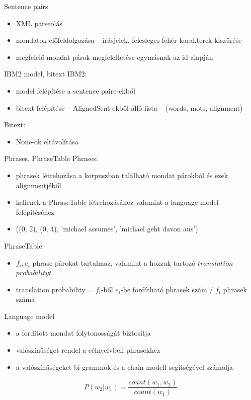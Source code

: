\begin{frame}{Sentence pairs}
	\begin{itemize}
		\item XML parseolás
		\item mondatok előfeldolgozása -- írásjelek, felesleges fehér karakterek kiszűrése
		\item megfelelő mondat párok megfeleltetése egymásnak az id alapján
	\end{itemize}

\end{frame}

\begin{frame}{IBM2 model, bitext}
	IBM2:
	\begin{itemize}
		\item model felépítése a sentence paire-ekből
		\item bitext felépítése -- AlignedSent-ekből álló lista -- (words, mots, alignment)
	\end{itemize}
	
	Bitext:
	\begin{itemize}
		\item None-ok eltávolítása
	\end{itemize}
\end{frame}

\begin{frame}{Phrases, PhraseTable}
	Phrases:
	\begin{itemize}
		\item phrasek létrehozása a korpuszban található mondat párokból és ezek alignmentjéből
		\item kellenek a PhraseTable létrehozásához valamint a language model felépítéséhez
		\item ((0, 2), (0, 4), 'michael assumes', 'michael geht davon aus')	
	\end{itemize}
	
	PhraseTable:
	\begin{itemize}
		\item $f_i, e_i$ phrase párokat tartalmaz, valamint a hozzuk tartozó $translation$ $probabilityt$
		\item translation probability = $f_i$-ből $e_i$-be fordítható phrasek szám / $f_i$ phrasek száma
	\end{itemize}
	
\end{frame}

\begin{frame}{Language model}
	\begin{itemize}
		\item a fordított mondat folytonosságát biztosítja
		\item valószínűséget rendel a célnyelvbeli phrasekhez
		\item a valószínűségeket bi-grammok és a chain modell segítségével számolja
	\end{itemize}
	\begin{equation}
		P(w_2|w_1) = \frac{count(w_1, w_2)}{count(w_1)}
	\end{equation}
\end{frame}

